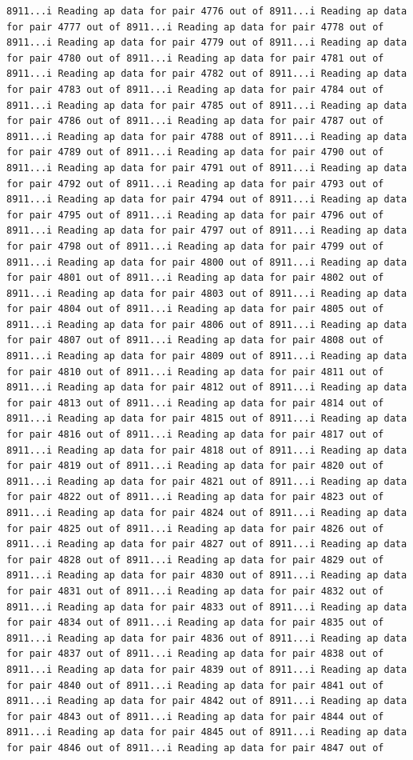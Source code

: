 \documentclass[
]{article}
\begin{document}
\begin{verbatim}
8911...i Reading ap data for pair 4776 out of 8911...i Reading ap data for pair 4777 out of 8911...i Reading ap data for pair 4778 out of 8911...i Reading ap data for pair 4779 out of 8911...i Reading ap data for pair 4780 out of 8911...i Reading ap data for pair 4781 out of 8911...i Reading ap data for pair 4782 out of 8911...i Reading ap data for pair 4783 out of 8911...i Reading ap data for pair 4784 out of 8911...i Reading ap data for pair 4785 out of 8911...i Reading ap data for pair 4786 out of 8911...i Reading ap data for pair 4787 out of 8911...i Reading ap data for pair 4788 out of 8911...i Reading ap data for pair 4789 out of 8911...i Reading ap data for pair 4790 out of 8911...i Reading ap data for pair 4791 out of 8911...i Reading ap data for pair 4792 out of 8911...i Reading ap data for pair 4793 out of 8911...i Reading ap data for pair 4794 out of 8911...i Reading ap data for pair 4795 out of 8911...i Reading ap data for pair 4796 out of 8911...i Reading ap data for pair 4797 out of 8911...i Reading ap data for pair 4798 out of 8911...i Reading ap data for pair 4799 out of 8911...i Reading ap data for pair 4800 out of 8911...i Reading ap data for pair 4801 out of 8911...i Reading ap data for pair 4802 out of 8911...i Reading ap data for pair 4803 out of 8911...i Reading ap data for pair 4804 out of 8911...i Reading ap data for pair 4805 out of 8911...i Reading ap data for pair 4806 out of 8911...i Reading ap data for pair 4807 out of 8911...i Reading ap data for pair 4808 out of 8911...i Reading ap data for pair 4809 out of 8911...i Reading ap data for pair 4810 out of 8911...i Reading ap data for pair 4811 out of 8911...i Reading ap data for pair 4812 out of 8911...i Reading ap data for pair 4813 out of 8911...i Reading ap data for pair 4814 out of 8911...i Reading ap data for pair 4815 out of 8911...i Reading ap data for pair 4816 out of 8911...i Reading ap data for pair 4817 out of 8911...i Reading ap data for pair 4818 out of 8911...i Reading ap data for pair 4819 out of 8911...i Reading ap data for pair 4820 out of 8911...i Reading ap data for pair 4821 out of 8911...i Reading ap data for pair 4822 out of 8911...i Reading ap data for pair 4823 out of 8911...i Reading ap data for pair 4824 out of 8911...i Reading ap data for pair 4825 out of 8911...i Reading ap data for pair 4826 out of 8911...i Reading ap data for pair 4827 out of 8911...i Reading ap data for pair 4828 out of 8911...i Reading ap data for pair 4829 out of 8911...i Reading ap data for pair 4830 out of 8911...i Reading ap data for pair 4831 out of 8911...i Reading ap data for pair 4832 out of 8911...i Reading ap data for pair 4833 out of 8911...i Reading ap data for pair 4834 out of 8911...i Reading ap data for pair 4835 out of 8911...i Reading ap data for pair 4836 out of 8911...i Reading ap data for pair 4837 out of 8911...i Reading ap data for pair 4838 out of 8911...i Reading ap data for pair 4839 out of 8911...i Reading ap data for pair 4840 out of 8911...i Reading ap data for pair 4841 out of 8911...i Reading ap data for pair 4842 out of 8911...i Reading ap data for pair 4843 out of 8911...i Reading ap data for pair 4844 out of 8911...i Reading ap data for pair 4845 out of 8911...i Reading ap data for pair 4846 out of 8911...i Reading ap data for pair 4847 out of 
\end{verbatim}
\end{document}
